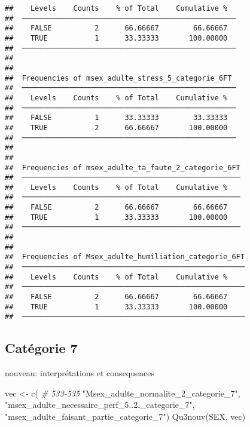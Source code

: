 \documentclass[
]{article}
\newenvironment{Shaded}{\begin{snugshade}}{\end{snugshade}}
\newcommand{\CommentTok}[1]{\textcolor[rgb]{0.56,0.35,0.01}{\textit{#1}}}
\newcommand{\FunctionTok}[1]{\textcolor[rgb]{0.00,0.00,0.00}{#1}}
\newcommand{\NormalTok}[1]{#1}
\newcommand{\OtherTok}[1]{\textcolor[rgb]{0.56,0.35,0.01}{#1}}
\newcommand{\StringTok}[1]{\textcolor[rgb]{0.31,0.60,0.02}{#1}}
\begin{document}
\begin{verbatim}
##    Levels    Counts    % of Total    Cumulative %   
##  ────────────────────────────────────────────────── 
##    FALSE          2      66.66667        66.66667   
##    TRUE           1      33.33333       100.00000   
##  ────────────────────────────────────────────────── 
## 
## 
##  Frequencies of msex_adulte_stress_5_categorie_6FT  
##  ────────────────────────────────────────────────── 
##    Levels    Counts    % of Total    Cumulative %   
##  ────────────────────────────────────────────────── 
##    FALSE          1      33.33333        33.33333   
##    TRUE           2      66.66667       100.00000   
##  ────────────────────────────────────────────────── 
## 
## 
##  Frequencies of msex_adulte_ta_faute_2_categorie_6FT 
##  ─────────────────────────────────────────────────── 
##    Levels    Counts    % of Total    Cumulative %   
##  ─────────────────────────────────────────────────── 
##    FALSE          2      66.66667        66.66667   
##    TRUE           1      33.33333       100.00000   
##  ─────────────────────────────────────────────────── 
## 
## 
##  Frequencies of Msex_adulte_humiliation_categorie_6FT 
##  ──────────────────────────────────────────────────── 
##    Levels    Counts    % of Total    Cumulative %   
##  ──────────────────────────────────────────────────── 
##    FALSE          2      66.66667        66.66667   
##    TRUE           1      33.33333       100.00000   
##  ────────────────────────────────────────────────────
\end{verbatim}

\hypertarget{catuxe9gorie-7-1}{%
\subsection{Catégorie 7}\label{catuxe9gorie-7-1}}

nouveau: interprétations et consequences

\begin{Shaded}
\begin{Highlighting}[]
\NormalTok{vec }\OtherTok{\textless{}{-}} \FunctionTok{c}\NormalTok{(  }\CommentTok{\# 533{-}535}
   \StringTok{"Msex\_adulte\_normalite\_2\_categorie\_7"}\NormalTok{,}
   \StringTok{"msex\_adulte\_necessaire\_perf\_5..2.\_categorie\_7"}\NormalTok{,}
   \StringTok{"msex\_adulte\_faisant\_partie\_categorie\_7"}\NormalTok{)}
\FunctionTok{Qu3nouv}\NormalTok{(SEX, vec)}
\end{Highlighting}
\end{Shaded}
\end{document}

